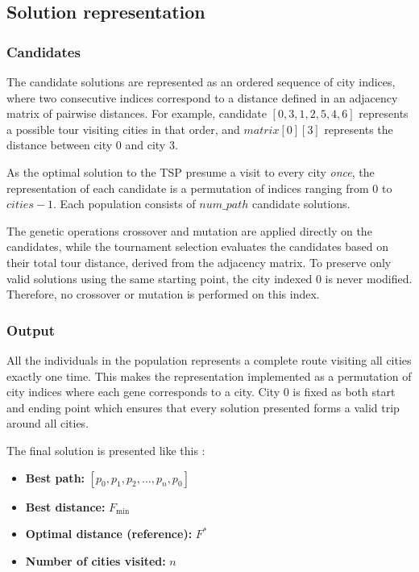 \documentclass{scrartcl}
\begin{document}
\subsection{Solution representation}
\subsubsection{Candidates}
The candidate solutions are represented as an ordered sequence of city indices, where two consecutive indices correspond to a distance defined in an adjacency matrix of pairwise distances. For example, candidate $[0, 3, 1, 2, 5, 4, 6]$ represents a possible tour visiting cities in that order, and $matrix[0][3]$ represents the distance between city 0 and city 3. 

As the optimal solution to the TSP presume a visit to every city \textit{once}, the representation of each candidate is a permutation of indices ranging from $0$ to $cities-1$. Each population consists of $num\_path$ candidate solutions.

The genetic operations crossover and mutation are applied directly on the candidates, while the tournament selection evaluates the candidates based on their total tour distance, derived from the adjacency matrix. To preserve only valid solutions using the same starting point, the city indexed 0 is never modified. Therefore, no crossover or mutation is performed on this index.

\subsubsection{Output}
All the individuals in the population represents a complete route visiting all cities exactly one time. This makes the representation implemented as a permutation of city indices where each gene corresponds to a city. 
City 0 is fixed as both start and ending point which ensures that every solution presented forms a valid trip around all cities.

The final solution is presented like this :
 \begin{itemize}
    \item \textbf{Best path:} $[p_0, p_1, p_2, \dots, p_n, p_0]$
    \item \textbf{Best distance:} $F_{\text{min}}$
    \item \textbf{Optimal distance (reference):} $F^*$
    \item \textbf{Number of cities visited:} $n$
 \end{itemize}
\end{document}
